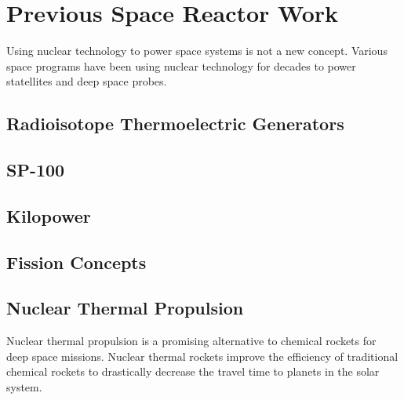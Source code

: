 \section{Previous Space Reactor Work}
Using nuclear technology to power space systems is not a new concept. Various
space programs have been using nuclear technology for decades to power
statellites and deep space probes.

\subsection{Radioisotope Thermoelectric Generators}

\subsection{SP-100}

\subsection{Kilopower}

\subsection{Fission Concepts}

\subsection { Nuclear Thermal Propulsion }

Nuclear thermal propulsion is a promising alternative to chemical rockets for
deep space missions. Nuclear thermal rockets improve the efficiency of
traditional chemical rockets to drastically decrease the travel time to planets
in the solar system. 
